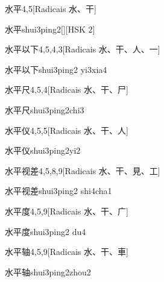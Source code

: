 \begin{entry}{水平}{4,5}[Radicais ⽔、⼲]
  \begin{phonetics}{水平}{shui3ping2}[][HSK 2]
  \end{phonetics}
\end{entry}

\begin{entry}{水平以下}{4,5,4,3}[Radicais ⽔、⼲、⼈、⼀]
  \begin{phonetics}{水平以下}{shui3ping2 yi3xia4}
  \end{phonetics}
\end{entry}

\begin{entry}{水平尺}{4,5,4}[Radicais ⽔、⼲、⼫]
  \begin{phonetics}{水平尺}{shui3ping2chi3}
  \end{phonetics}
\end{entry}

\begin{entry}{水平仪}{4,5,5}[Radicais ⽔、⼲、⼈]
  \begin{phonetics}{水平仪}{shui3ping2yi2}
  \end{phonetics}
\end{entry}

\begin{entry}{水平视差}{4,5,8,9}[Radicais ⽔、⼲、⾒、⼯]
  \begin{phonetics}{水平视差}{shui3ping2 shi4cha1}
  \end{phonetics}
\end{entry}

\begin{entry}{水平度}{4,5,9}[Radicais ⽔、⼲、⼴]
  \begin{phonetics}{水平度}{shui3ping2 du4}
  \end{phonetics}
\end{entry}

\begin{entry}{水平轴}{4,5,9}[Radicais ⽔、⼲、⾞]
  \begin{phonetics}{水平轴}{shui3ping2zhou2}
  \end{phonetics}
\end{entry}


